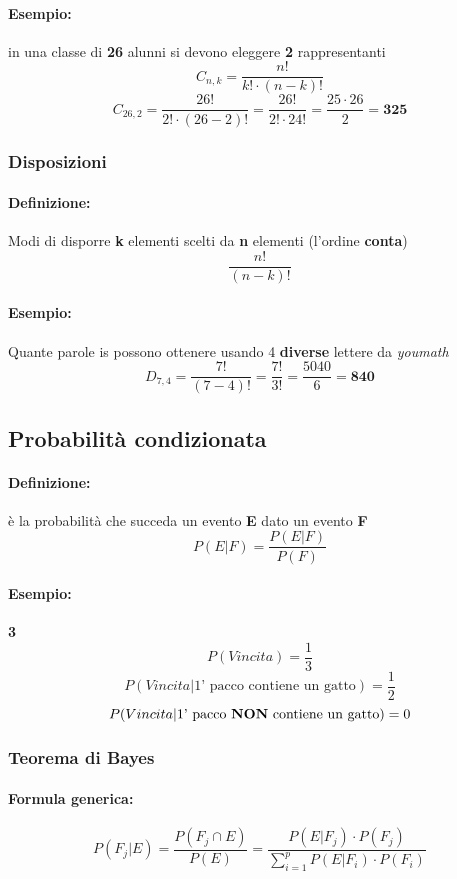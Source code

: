 \documentclass[]{article}
\newcommand{\definizione}{\paragraph{Definizione:}}
\newcommand{\formula}{\paragraph{Formula generica:}}
\begin{document}
    \paragraph{Esempio:} in una classe di \textbf{26} alunni si devono eleggere \textbf{2} rappresentanti
    \[ C_{n,k} = \frac{n!}{k! \cdot (n-k)!} \]
    \[ C_{26,2} = \frac{26!}{2! \cdot (26-2)!} = \frac{26!}{2! \cdot 24!} = \frac{25 \cdot 26}{2} = \textbf{325} \]
    \begin{center} 
    \end{center}

    \subsubsection{Disposizioni}
    \definizione Modi di disporre \textbf{k} elementi scelti da \textbf{n} elementi (l'ordine \textbf{conta})
    \[ \frac{n!}{(n-k)!}\]
    \paragraph{Esempio:} Quante parole is possono ottenere usando 4 \textbf{diverse} lettere da \textit{youmath} 
    \[ D_{7,4} = \frac{7!}{(7-4)!} = \frac{7!}{3!} = \frac{5040}{6} = \textbf{840} \]



    \subsection{Probabilità condizionata}
    \definizione è la probabilità che succeda un evento \textbf{E} dato un evento \textbf{F}
    \[ P(E | F) = \frac{P(E | F)}{P(F)}\]
    \paragraph{Esempio:} \textbf{3}  \\
    \[ P(Vincita) = \frac{1}{3}\]
    \[ P(Vincita | \text{1' pacco contiene un gatto}) = \frac{1}{2}\]
    \[ P(Vincita | \text{1' pacco \textbf{NON} contiene un gatto}) = 0\]



    \subsubsection{Teorema di Bayes}
    \formula \[ P(F_j | E) = \frac{P(F_j \cap E)}{P(E)} = \frac{P(E | F_j) \cdot P(F_j)}{\sum_{i = 1}^{p} P(E | F_i) \cdot P(F_i)} \]
    \begin{center} 
    \end{center}
\end{document}
